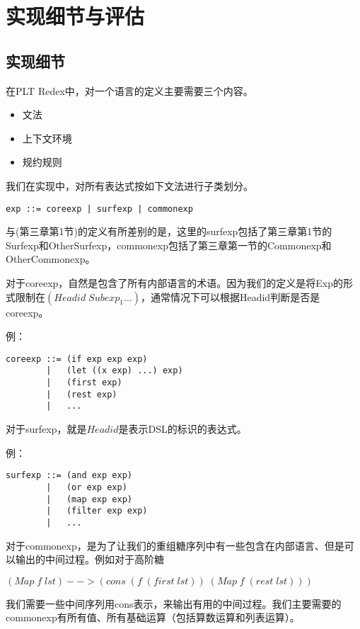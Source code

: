 \pagestyle{fancy}
\normalsize
\linespread{1.5}\selectfont
\chapter{实现细节与评估}

\section{实现细节}
在PLT Redex中，对一个语言的定义主要需要三个内容。
\begin{itemize}
	\item 文法
	\item 上下文环境
	\item 规约规则
\end{itemize}

我们在实现中，对所有表达式按如下文法进行子类划分。
\begin{verbatim}
exp ::= coreexp | surfexp | commonexp
\end{verbatim}

与(第三章第1节)的定义有所差别的是，这里的surfexp包括了第三章第1节的Surfexp和OtherSurfexp，commonexp包括了第三章第一节的Commonexp和OtherCommonexp。

对于coreexp，自然是包含了所有内部语言的术语。因为我们的定义是将Exp的形式限制在$(Headid\;Subexp_{1}\ldots)$，通常情况下可以根据Headid判断是否是coreexp。

例：
\begin{verbatim}
coreexp ::= (if exp exp exp)
		|   (let ((x exp) ...) exp)
		|   (first exp)
		|   (rest exp)
		|   ...
\end{verbatim}

对于surfexp，就是$Headid$是表示DSL的标识的表达式。

例：
\begin{verbatim}
surfexp ::= (and exp exp)
		|   (or exp exp)
		|   (map exp exp)
		|   (filter exp exp)
		|   ...
\end{verbatim}

对于commonexp，是为了让我们的重组糖序列中有一些包含在内部语言、但是可以输出的中间过程。例如对于高阶糖

$(Map\;f\;lst)-->(cons\;(f\;(first\;lst))\;(Map\;f\;(rest\;lst)))$

\begin{flushleft}
	我们需要一些中间序列用cons表示，来输出有用的中间过程。我们主要需要的commonexp有所有值、所有基础运算（包括算数运算和列表运算）。
\end{flushleft}

